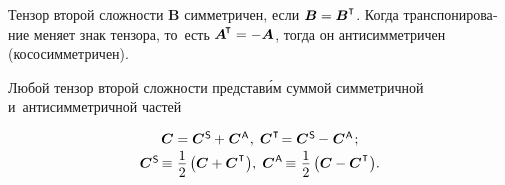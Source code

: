 \begin{otherlanguage}{russian}

Тензор второй сложности ${\bm{B}}$ симметричен, если ${\bm{B} = \bm{B}^{\T}}$. Когда транспонирование меняет знак тензора, то~есть ${\bm{A}^{\hspace{-0.1em}\T} = - \bm{A}}$, тогда он антисимметричен (кососимметричен).

Любой тензор второй сложности представ\'{и}м суммой симметричной и~антисимметричной частей

\nopagebreak\vspace{-0.1em}\begin{equation}\begin{array}{c}
\bm{C} = \bm{C}^{\mathsf{\hspace{.1ex}S}} \hspace{-0.1ex}+\hspace{.1ex} \bm{C}^{\mathsf{\hspace{.1ex}A}}\hspace{.1ex} , \;
\bm{C}^{\hspace{.1ex}\T} \hspace{-0.33ex} = \bm{C}^{\mathsf{\hspace{.1ex}S}} \hspace{-0.1ex}-\hspace{.1ex} \bm{C}^{\mathsf{\hspace{.1ex}A}}
\hspace{.2ex} ;
\\[0.2em]
\bm{C}^{\mathsf{\hspace{.1ex}S}} \hspace{-0.22ex} \equiv \hspace{.1ex} \displaystyle \onehalf \left( {\bm{C} + \bm{C}^{\hspace{.1ex}\T}}\hspace{.1ex} \right)\!, \;
\bm{C}^{\mathsf{\hspace{.1ex}A}} \hspace{-0.22ex} \equiv \hspace{.1ex} \displaystyle \onehalf \left( {\bm{C} - \bm{C}^{\hspace{.1ex}\T}}\hspace{.1ex} \right)\!.
\end{array}\end{equation}


\end{otherlanguage}
